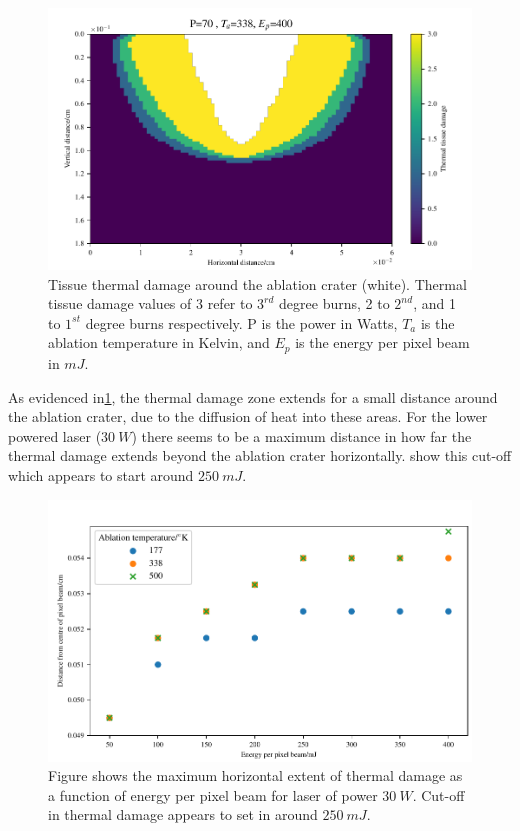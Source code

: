 \begin{figure}[!h]
	\centering
	\includegraphics[width=\columnwidth]{./ablation/images/damage-slice.pdf}
	\caption{Tissue thermal damage around the ablation crater (white). Thermal tissue damage values of 3 refer to $3^{rd}$ degree burns, 2 to $2^{nd}$, and 1 to $1^{st}$ degree burns respectively. P is the power in Watts, $T_a$ is the ablation temperature in Kelvin, and $E_p$ is the energy per pixel beam in $mJ$.}
	\label{fig:damfig}
\end{figure}
	
As evidenced in\cref{fig:damfig}, the thermal damage zone extends for a small distance around the ablation crater, due to the diffusion of heat into these areas. For the lower powered laser ($30~W$) there seems to be a maximum distance in how far the thermal damage extends beyond the ablation crater horizontally.  show this cut-off which appears to start around $250~mJ$.  
	
\begin{figure}[!h]
	\centering
	\includegraphics[width=\columnwidth]{./ablation/images/horz-30w.pdf}
	\caption{Figure shows the maximum horizontal extent of thermal damage as a function of energy per pixel beam for laser of power $30~W$. Cut-off in thermal damage appears to set in around $250~mJ$.}
	\label{fig:horz-30}
\end{figure}

